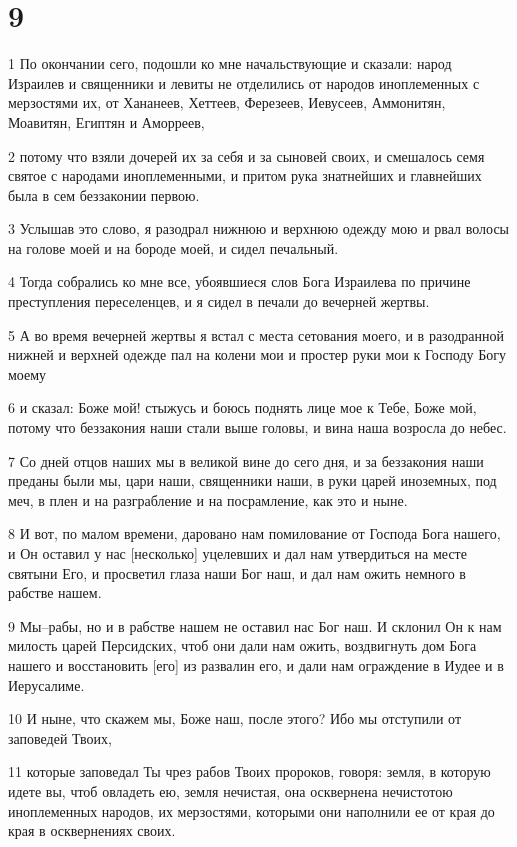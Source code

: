 \chapter{9}

\par 1 По окончании сего, подошли ко мне начальствующие и сказали: народ Израилев и священники и левиты не отделились от народов иноплеменных с мерзостями их, от Хананеев, Хеттеев, Ферезеев, Иевусеев, Аммонитян, Моавитян, Египтян и Аморреев,
\par 2 потому что взяли дочерей их за себя и за сыновей своих, и смешалось семя святое с народами иноплеменными, и притом рука знатнейших и главнейших была в сем беззаконии первою.
\par 3 Услышав это слово, я разодрал нижнюю и верхнюю одежду мою и рвал волосы на голове моей и на бороде моей, и сидел печальный.
\par 4 Тогда собрались ко мне все, убоявшиеся слов Бога Израилева по причине преступления переселенцев, и я сидел в печали до вечерней жертвы.
\par 5 А во время вечерней жертвы я встал с места сетования моего, и в разодранной нижней и верхней одежде пал на колени мои и простер руки мои к Господу Богу моему
\par 6 и сказал: Боже мой! стыжусь и боюсь поднять лице мое к Тебе, Боже мой, потому что беззакония наши стали выше головы, и вина наша возросла до небес.
\par 7 Со дней отцов наших мы в великой вине до сего дня, и за беззакония наши преданы были мы, цари наши, священники наши, в руки царей иноземных, под меч, в плен и на разграбление и на посрамление, как это и ныне.
\par 8 И вот, по малом времени, даровано нам помилование от Господа Бога нашего, и Он оставил у нас [несколько] уцелевших и дал нам утвердиться на месте святыни Его, и просветил глаза наши Бог наш, и дал нам ожить немного в рабстве нашем.
\par 9 Мы--рабы, но и в рабстве нашем не оставил нас Бог наш. И склонил Он к нам милость царей Персидских, чтоб они дали нам ожить, воздвигнуть дом Бога нашего и восстановить [его] из развалин его, и дали нам ограждение в Иудее и в Иерусалиме.
\par 10 И ныне, что скажем мы, Боже наш, после этого? Ибо мы отступили от заповедей Твоих,
\par 11 которые заповедал Ты чрез рабов Твоих пророков, говоря: земля, в которую идете вы, чтоб овладеть ею, земля нечистая, она осквернена нечистотою иноплеменных народов, их мерзостями, которыми они наполнили ее от края до края в осквернениях своих.
